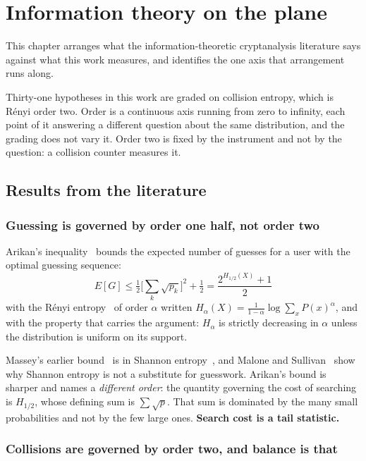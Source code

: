 \chapter{Information theory on the plane}

This chapter arranges what the information-theoretic cryptanalysis literature says against what this work measures, and identifies the one axis that arrangement runs along.

Thirty-one hypotheses in this work are graded on collision entropy, which is Rényi order two. Order is a continuous axis running from zero to infinity, each point of it answering a different question about the same distribution, and the grading does not vary it. Order two is fixed by the instrument and not by the question: a collision counter measures it.

\section{Results from the literature}

\subsection{Guessing is governed by order one half, not order two}

Arikan's inequality~\cite{src:Arikan-1996} bounds the expected number of guesses for a user with the optimal guessing sequence:
\[
E[G] \le \tfrac{1}{2}\Big[\sum_k \sqrt{p_k}\Big]^2 + \tfrac{1}{2} = \frac{2^{H_{1/2}(X)} + 1}{2}
\]
with the Rényi entropy~\cite{src:Renyi} of order \(\alpha\) written \(H_\alpha(X) = \frac{1}{1-\alpha}\log \sum_x P(x)^\alpha\), and with the property that carries the argument: \(H_\alpha\) is strictly decreasing in \(\alpha\) unless the distribution is uniform on its support.

Massey's earlier bound~\cite{src:Massey-1994} is in Shannon entropy~\cite{src:Shannon}, and Malone and Sullivan~\cite{src:Malone-and-Sullivan-2005} show why Shannon entropy is not a substitute for guesswork. Arikan's bound is sharper and names a \emph{different order}: the quantity governing the cost of searching is \(H_{1/2}\), whose defining sum is \(\sum \sqrt{p}\). That sum is dominated by the many small probabilities and not by the few large ones. \textbf{Search cost is a tail statistic.}

\subsection{Collisions are governed by order two, and balance is that}

